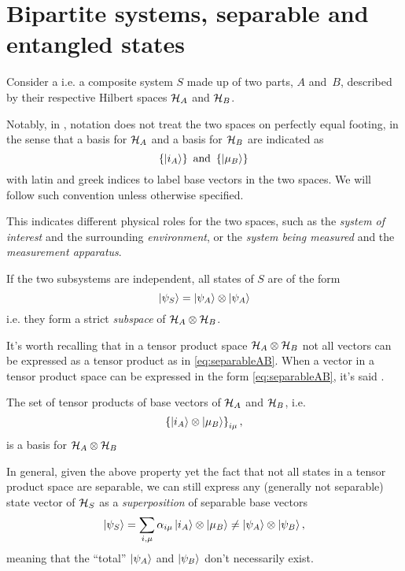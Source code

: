 \section{Bipartite systems, separable and entangled states}

Consider a 
i.e. a composite system $S$
made up of two parts, $A$ and~$B$,
described by their respective Hilbert spaces
$\mathcal{H}_A$ and $\mathcal{H}_B$.

Notably, in \cite{Haroche_Exploring},
notation does not treat the two spaces
on perfectly equal footing,
in the sense that a basis for $\mathcal{H}_A$ and a basis for $\mathcal{H}_B$
are indicated as
$$
  \left\{\ket{i_A}\right\} \text{ and } \left\{\ket{\mu_B}\right\}\,
$$
with latin and greek indices to label base vectors in the two spaces.
We will follow such convention unless otherwise specified.

This indicates different physical roles for the two spaces,
such as the \emph{system of interest} and the surrounding \emph{environment},
or the \emph{system being measured} and the \emph{measurement apparatus}.

If the two subsystems are independent, all states of $S$ are of the form
\begin{equation}\label{eq:separableAB}
  \ket{\psi_S} = \ket{\psi_A}\otimes\ket{\psi_A}
\end{equation}
i.e. they form a strict \emph{subspace} of $\mathcal{H}_A\otimes\mathcal{H}_B$.

It's worth recalling that in a tensor product space $\mathcal{H}_A\otimes\mathcal{H}_B$
not all vectors can be expressed as a tensor product as in \eqref{eq:separableAB}.
When a vector in a tensor product space
can be expressed in the form \eqref{eq:separableAB},
it's said  \parencite{Nakahara}.

\begin{proposition}\label{TensorBase}
The set of tensor products of base vectors of $\mathcal{H}_A$ and $\mathcal{H}_B$,
i.e. $$\left\{\ket{i_A} \otimes \ket{\mu_B}\right\}_{i\mu},$$
is a basis for $\mathcal{H}_A \otimes \mathcal{H}_B$
\end{proposition}

In general, given the above property yet the fact that not all states
in a tensor product space are separable, we can still express any
(generally not separable) state vector of $\mathcal{H}_S$
as a \emph{superposition} of separable base vectors
\begin{equation}\label{eq:bipartite_expansion}
  \ket{\psi_S} = \sum_{i, \mu}\alpha_{i\mu}\ket{i_A}\otimes\ket{\mu_B} \neq \ket{\psi_A}\otimes\ket{\psi_B},
\end{equation}
meaning that the
``total'' $\ket{\psi_A}$ and $\ket{\psi_B}$ don't necessarily exist.

